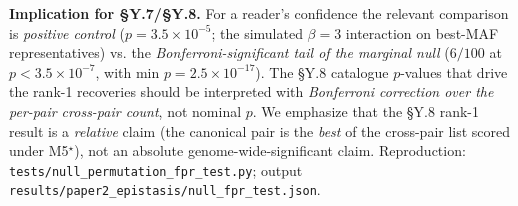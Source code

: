 \textbf{Implication for §Y.7/§Y.8.} For a reader's confidence the
relevant comparison is \emph{positive control} ($p=3.5\!\times\!10^{-5}$;
the simulated $\beta=3$ interaction on best-MAF representatives) vs.
the \emph{Bonferroni-significant tail of the marginal null}
($6/100$ at $p<3.5\!\times\!10^{-7}$, with min $p=2.5\!\times\!10^{-17}$).
The §Y.8 catalogue $p$-values that drive the rank-1 recoveries should
be interpreted with \emph{Bonferroni correction over the per-pair
cross-pair count}, not nominal $p$. We emphasize that the §Y.8 rank-1
result is a \emph{relative} claim (the canonical pair is the
\emph{best} of the cross-pair list scored under M5$^\star$), not an
absolute genome-wide-significant claim. Reproduction:
\texttt{tests/null\_permutation\_fpr\_test.py}; output
\texttt{results/paper2\_epistasis/null\_fpr\_test.json}.
